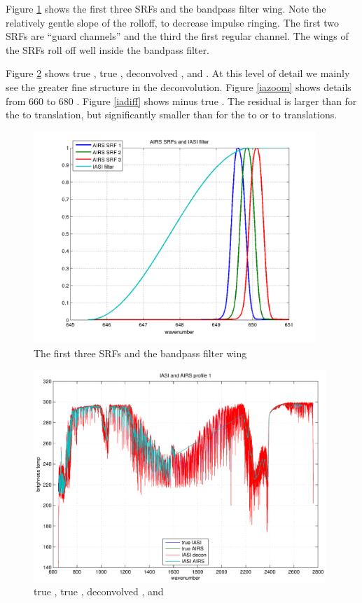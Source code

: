 \documentclass[12pt]{article}
\begin{document}
Figure \ref{srfs1} shows the first three {\airs} SRFs and the
bandpass filter wing.  Note the relatively gentle slope of the
rolloff, to decrease impulse ringing.  The first two {\airs} SRFs
are ``guard channels'' and the third the first regular channel.  
The wings of the SRFs roll off well inside the bandpass filter.

Figure \ref{iaspec} shows true {\iasi}, true {\airs}, deconvolved
{\iasi}, and {\iasi} {\airs}.  At this level of detail we mainly see
the greater fine structure in the deconvolution.  Figure \ref{iazoom}
shows details from 660 to 680 {\wn}.  Figure \ref{iadiff} shows
{\iasi} {\airs} minus true {\airs}.  The residual is larger than for
the {\iasi} to {\cris} translation, but significantly smaller than
for the {\airs} to {\cris} or {\cris} to {\airs} translations.

\begin{figure}
  \centering
  \includegraphics[height=8cm]{figures/srfs_and_filt.png}
  \caption{The first three {\airs} SRFs and the bandpass filter
    wing}
  \label{srfs1}
\end{figure}

\begin{figure}
  \centering
  \includegraphics[height=8cm]{figures/iasi_airs_spec.pdf}
  \caption{true {\iasi}, true {\airs}, deconvolved {\iasi}, and
    {\iasi} {\airs} }
  \label{iaspec}
\end{figure}
\end{document}
